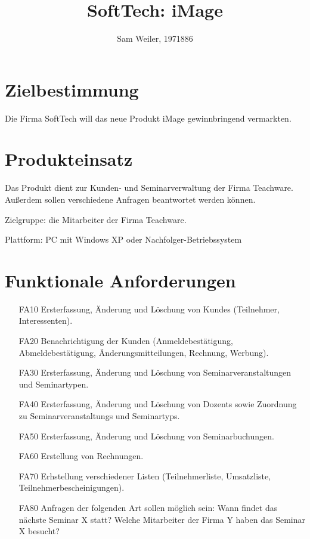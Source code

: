 \documentclass[parskip=full]{scrartcl}
\title{SoftTech: iMage}
\author{Sam Weiler, 1971886}
\begin{document}
\maketitle

\section{Zielbestimmung}
Die Firma SoftTech will das neue Produkt iMage gewinnbringend vermarkten.

\section{Produkteinsatz}
Das Produkt dient zur Kunden- und Seminarverwaltung der Firma Teachware. Außerdem sollen verschiedene Anfragen beantwortet werden können.

Zielgruppe: die Mitarbeiter der Firma Teachware.

Plattform: PC mit Windows XP oder Nachfolger-Betriebssystem

\section{Funktionale Anforderungen}
\begin{itemize}[nosep]
\item[FA10] Ersterfassung, Änderung und Löschung von \glspl{Kunde} (Teilnehmer, Interessenten).
\item[FA20] Benachrichtigung der Kunden (Anmeldebestätigung, Abmeldebestätigung, Änderungsmitteilungen, Rechnung, Werbung).
\item[FA30] Ersterfassung, Änderung und Löschung von Seminarveranstaltungen und Seminartypen.
\item[FA40] Ersterfassung, Änderung und Löschung von \glspl{Dozent} sowie Zuordnung zu \glspl{Seminarveranstaltung} und \glspl{Seminartyp}.
\item[FA50] Ersterfassung, Änderung und Löschung von Seminarbuchungen.
\item[FA60] Erstellung von Rechnungen.
\item[FA70] Erhstellung verschiedener Listen (Teilnehmerliste, Umsatzliste, Teilnehmerbescheinigungen).
\item[FA80] Anfragen der folgenden Art sollen möglich sein:
     Wann findet das nächste Seminar X statt? Welche Mitarbeiter der Firma Y haben das Seminar X besucht?
\end{itemize}
\end{document}
